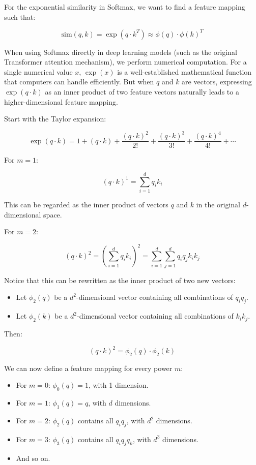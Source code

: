 For the exponential similarity in Softmax, we want to find a feature mapping such that:

\[
\mathrm{sim}(q,k) = \exp(q\cdot k^T) \approx \phi(q)\cdot\phi(k)^T
\]

When using Softmax directly in deep learning models (such as the original Transformer attention mechanism), we perform numerical computation. For a single numerical value \(x\), \(\exp(x)\) is a well-established mathematical function that computers can handle efficiently. But when \(q\) and \(k\) are vectors, expressing \(\exp(q\cdot k)\) as an inner product of two feature vectors naturally leads to a higher-dimensional feature mapping.

Start with the Taylor expansion:

\[
\exp(q\cdot k)
= 1 + (q\cdot k) + \frac{(q\cdot k)^2}{2!}
+ \frac{(q\cdot k)^3}{3!}
+ \frac{(q\cdot k)^4}{4!}
+ \cdots
\]

For \(m=1\):

\[
(q\cdot k)^1 = \sum_{i=1}^{d}q_i k_i
\]

This can be regarded as the inner product of vectors \(q\) and \(k\) in the original \(d\)-dimensional space.

For \(m=2\):

\[
(q\cdot k)^2
= \left(\sum_{i=1}^{d}q_i k_i\right)^2
= \sum_{i=1}^{d}\sum_{j=1}^{d}q_i q_j k_i k_j
\]

Notice that this can be rewritten as the inner product of two new vectors:

\begin{itemize}
\tightlist
\item
  Let \(\phi_2(q)\) be a \(d^2\)-dimensional vector containing all combinations of \(q_i q_j\).
\item
  Let \(\phi_2(k)\) be a \(d^2\)-dimensional vector containing all combinations of \(k_i k_j\).
\end{itemize}

Then:

\[
(q\cdot k)^2 = \phi_2(q)\cdot\phi_2(k)
\]

We can now define a feature mapping for every power \(m\):

\begin{itemize}
\tightlist
\item
  For \(m=0\): \(\phi_0(q)=1\), with 1 dimension.
\item
  For \(m=1\): \(\phi_1(q)=q\), with \(d\) dimensions.
\item
  For \(m=2\): \(\phi_2(q)\) contains all \(q_i q_j\), with \(d^2\) dimensions.
\item
  For \(m=3\): \(\phi_3(q)\) contains all \(q_i q_j q_k\), with \(d^3\) dimensions.
\item
  And so on.
\end{itemize}

